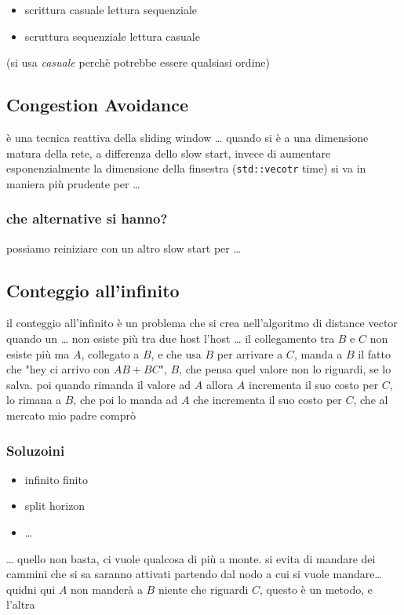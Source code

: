 \documentclass[11pt]{article}
\begin{document}
\begin{itemize}
\item scrittura casuale lettura sequenziale
\item scruttura sequenziale lettura casuale
\end{itemize}

(si usa \emph{casuale} perchè potrebbe essere qualsiasi ordine)

\subsection{Congestion Avoidance}
\label{sec:org0e12a9c}
è una tecnica reattiva della sliding window
\ldots{} quando si è a una dimensione matura della rete, a differenza dello slow start, invece di aumentare esponenzialmente la dimensione della finsestra (\texttt{std::vecotr} time)
si va in maniera più prudente per \ldots{}

\subsubsection{che alternative si hanno?}
\label{sec:orge45b3a8}
possiamo reiniziare con un altro slow start per \ldots{}

\subsection{Conteggio all'infinito}
\label{sec:orgb03c701}
il conteggio all'infinito è un problema che si crea nell'algoritmo di distance vector quando un \ldots{} non esiste più tra due host
l'host \ldots{}
il collegamento tra \(B\) e \(C\) non esiste più
ma \(A\), collegato a \(B\), e che usa \(B\) per arrivare a \(C\), manda a \(B\) il fatto che "hey ci arrivo con \(AB + BC\)", \(B\), che pensa quel valore non lo riguardi, se lo salva.
poi quando rimanda il valore ad \(A\) allora \(A\) incrementa il suo costo per \(C\), lo rimana a \(B\), che poi lo manda ad \(A\) che incrementa il suo costo per \(C\), che al mercato mio padre comprò

\subsubsection{Soluzoini}
\label{sec:orgbaf5541}
\begin{itemize}
\item infinito finito
\item split horizon
\item \ldots{}
\end{itemize}
\ldots{}
quello non basta, ci vuole qualcosa di più a monte.
si evita di mandare dei cammini che si sa saranno attivati partendo dal nodo a cui si vuole mandare\ldots{}
quidni qui \(A\) non manderà a \(B\) niente che riguardi \(C\), questo è un metodo, e l'altra
\end{document}
